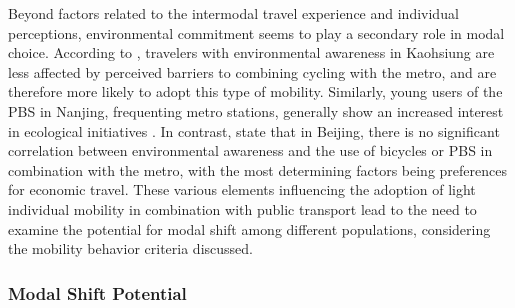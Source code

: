 \begin{refsegment}
Beyond factors related to the intermodal travel experience and individual perceptions, environmental commitment seems to play a secondary role in modal choice. According to \textcolor{blue}{\textcite[1700]{cheng_evaluating_2012}}, travelers with environmental awareness in Kaohsiung are less affected by perceived barriers to combining cycling with the metro, and are therefore more likely to adopt this type of mobility. Similarly, young users of the \acrshort{PBS} in Nanjing, frequenting metro stations, generally show an increased interest in ecological initiatives \textcolor{blue}{\autocite[5]{yang_empirical_2016}}. In contrast, \textcolor{blue}{\textcite[57]{zhao_bicycle-metro_2017}} state that in Beijing, there is no significant correlation between environmental awareness and the use of bicycles or \acrshort{PBS} in combination with the metro, with the most determining factors being preferences for economic travel. These various elements influencing the adoption of light individual mobility in combination with public transport lead to the need to examine the potential for modal shift among different populations, considering the mobility behavior criteria discussed.%

\subsubsection*{Modal Shift Potential
    \label{chap2:potentiel-report-modal}
    }


\end{refsegment}
